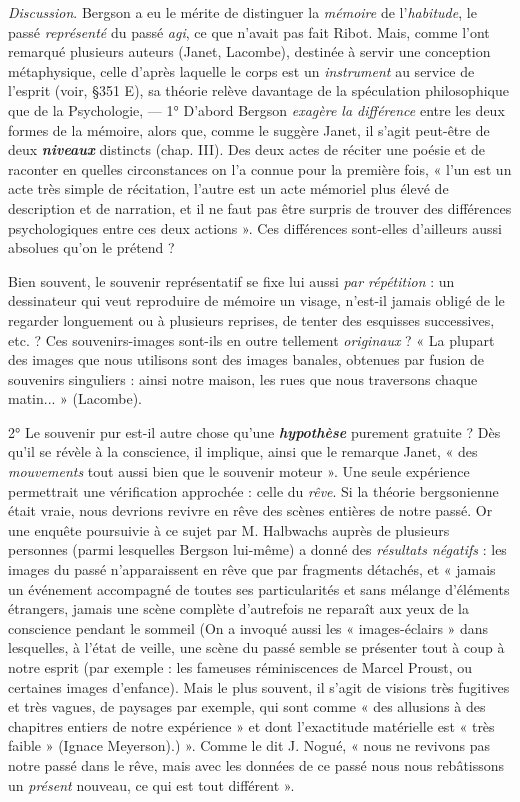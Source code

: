 {\it Discussion}. Bergson a eu le mérite de distinguer la {\it mémoire} de
l'{\it habitude}, le passé {\it représenté} du passé {\it agi}, ce que n'avait pas fait
Ribot. Mais, comme l’ont remarqué plusieurs auteurs (Janet,
Lacombe), destinée à servir une conception métaphysique, celle
d'après laquelle le corps est un {\it instrument} au service de l'esprit (voir,
\S 351 E), sa théorie relève davantage de la spéculation philosophique
que de la Psychologie, — 1° D’abord Bergson {\it exagère la différence}
entre les deux formes de la mémoire, alors que, comme le suggère
Janet, il s’agit peut-être de deux \textbf{\textit {niveaux}} distincts (chap. III). Des
deux actes de réciter une poésie et de raconter en quelles circonstances
on l’a connue pour la première fois, « l’un est un acte très simple de
récitation, l’autre est un acte mémoriel plus élevé de description et
de narration, et il ne faut pas être surpris de trouver des différences
psychologiques entre ces deux actions ». Ces différences sont-elles
d’ailleurs aussi absolues qu’on le prétend ?

\vspace{0.24cm}
{\footnotesize 
Bien souvent, le souvenir représentatif se fixe lui aussi {\it par répétition} :
un dessinateur qui veut reproduire de mémoire un visage, n'est-il jamais
obligé de le regarder longuement ou à plusieurs reprises, de tenter des
esquisses successives, etc. ? Ces souvenirs-images sont-ils en outre tellement
{\it originaux} ? « La plupart des images que nous utilisons sont des images
banales, obtenues par fusion de souvenirs singuliers : ainsi notre maison,
les rues que nous traversons chaque matin... » (Lacombe).}
\vspace{0.31cm}

2° Le souvenir pur est-il autre chose qu’une \textbf{\textit {hypothèse}} purement
gratuite ? Dès qu’il se révèle à la conscience, il implique, ainsi que le
remarque Janet, « des {\it mouvements} tout aussi bien que le souvenir
moteur ». Une seule expérience permettrait une vérification approchée :
celle du {\it rêve}. Si la théorie bergsonienne était vraie, nous devrions
revivre en rêve des scènes entières de notre passé. Or une enquête
poursuivie à ce sujet par M. Halbwachs auprès de plusieurs personnes
(parmi lesquelles Bergson lui-même) a donné des {\it résultats
négatifs} : les images du passé n’apparaissent en rêve que par fragments
détachés, et « jamais un événement accompagné de toutes
ses particularités et sans mélange d’éléments étrangers, jamais une
scène complète d’autrefois ne reparaît aux yeux de la conscience
pendant le sommeil
{\scriptsize (On a invoqué aussi les « images-éclairs » dans lesquelles, à l’état de veille, une
scène du passé semble se présenter tout à coup à notre esprit (par exemple : les fameuses
réminiscences de Marcel Proust, ou certaines images d'enfance). Mais le plus souvent,
il s’agit de visions très fugitives et très vagues, de paysages par exemple, qui sont comme
« des allusions à des chapitres entiers de notre expérience » et dont l'exactitude
matérielle est « très faible » (Ignace Meyerson).)}
». Comme le dit J. Nogué, « nous ne revivons
pas notre passé dans le rêve, mais avec les données de ce passé nous
nous rebâtissons un {\it présent} nouveau, ce qui est tout différent ».

